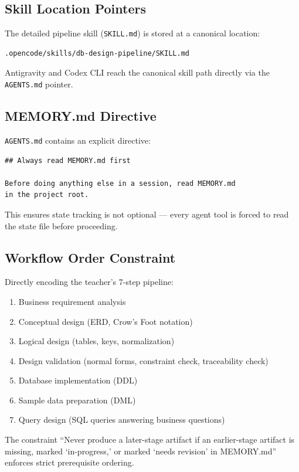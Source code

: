 \documentclass[12pt,a4paper]{article}
\begin{document}
\subsection{Skill Location Pointers}

The detailed pipeline skill (\texttt{SKILL.md}) is stored at a canonical location:
\begin{lstlisting}
.opencode/skills/db-design-pipeline/SKILL.md
\end{lstlisting}

Antigravity and Codex CLI reach the canonical skill path directly via the \texttt{AGENTS.md} pointer.

\subsection{MEMORY.md Directive}

\texttt{AGENTS.md} contains an explicit directive:

\begin{lstlisting}
## Always read MEMORY.md first

Before doing anything else in a session, read MEMORY.md
in the project root.
\end{lstlisting}

This ensures state tracking is not optional --- every agent tool is forced to read the state file before proceeding.

\subsection{Workflow Order Constraint}

Directly encoding the teacher's 7-step pipeline:

\begin{enumerate}
    \item Business requirement analysis
    \item Conceptual design (ERD, Crow's Foot notation)
    \item Logical design (tables, keys, normalization)
    \item Design validation (normal forms, constraint check, traceability check)
    \item Database implementation (DDL)
    \item Sample data preparation (DML)
    \item Query design (SQL queries answering business questions)
\end{enumerate}

The constraint ``Never produce a later-stage artifact if an earlier-stage artifact is missing, marked `in-progress,' or marked `needs revision' in MEMORY.md'' enforces strict prerequisite ordering.
\end{document}
